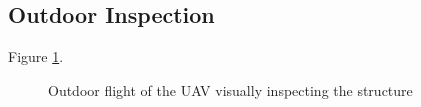\documentclass[12pt]{report}
\begin{document}
\subsection{Outdoor Inspection}
Figure \ref{fig:outdoor_flight}.
\begin{figure}[htp]
	\centering 
	\caption{Outdoor flight of the UAV visually inspecting the structure}
   \label{fig:outdoor_flight}
\end{figure}

%


\end{document}
